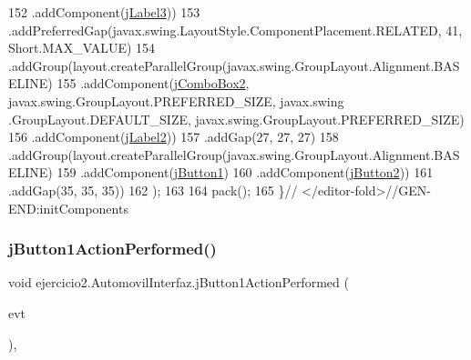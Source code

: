 \begin{DoxyCode}
152                     .addComponent(\mbox{\hyperlink{classejercicio2_1_1_automovil_interfaz_aa01e4eef9c730b99950e3bbce2ecd80d}{jLabel3}}))
153                 .addPreferredGap(javax.swing.LayoutStyle.ComponentPlacement.RELATED, 41, Short.MAX\_VALUE)
154                 .addGroup(layout.createParallelGroup(javax.swing.GroupLayout.Alignment.BASELINE)
155                     .addComponent(\mbox{\hyperlink{classejercicio2_1_1_automovil_interfaz_a787595d150a8ebd65cb621823b577788}{jComboBox2}}, javax.swing.GroupLayout.PREFERRED\_SIZE, javax.swing
      .GroupLayout.DEFAULT\_SIZE, javax.swing.GroupLayout.PREFERRED\_SIZE)
156                     .addComponent(\mbox{\hyperlink{classejercicio2_1_1_automovil_interfaz_a70af4ec3e989a5ed4b835e00e84690c8}{jLabel2}}))
157                 .addGap(27, 27, 27)
158                 .addGroup(layout.createParallelGroup(javax.swing.GroupLayout.Alignment.BASELINE)
159                     .addComponent(\mbox{\hyperlink{classejercicio2_1_1_automovil_interfaz_a75207245626e5d71c200b02b55319a87}{jButton1}})
160                     .addComponent(\mbox{\hyperlink{classejercicio2_1_1_automovil_interfaz_ac92a1987525c5e7afa6eee2ae7d74787}{jButton2}}))
161                 .addGap(35, 35, 35))
162         );
163 
164         pack();
165     \}\textcolor{comment}{// </editor-fold>//GEN-END:initComponents}
\end{DoxyCode}
\mbox{\label{classejercicio2_1_1_automovil_interfaz_a48ab723d1cfb8e8d2bbbf13da2bbf276}} 
\subsubsection{\texorpdfstring{j\+Button1\+Action\+Performed()}{jButton1ActionPerformed()}}
{\footnotesize\ttfamily void ejercicio2.\+Automovil\+Interfaz.\+j\+Button1\+Action\+Performed (\begin{DoxyParamCaption}\item[{java.\+awt.\+event.\+Action\+Event}]{evt }\end{DoxyParamCaption})\hspace{0.3cm}{\ttfamily [inline]}, {\ttfamily [private]}}


